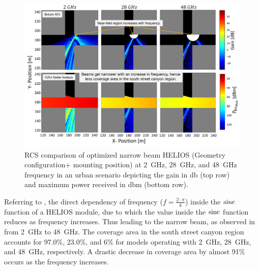 \begin{figure}[tb]
	\centering
	\includegraphics[width=0.95\linewidth]{images/Section 4 Images/Freq_vary_2}
	\caption{RCS comparison of optimized narrow beam HELIOS (Geometry configuration+ mounting position) at \SI{2}{\giga\hertz}, \SI{28}{\giga\hertz}, and \SI{48}{\giga\hertz} frequency in an urban scenario depicting the gain in \si{\decibel} (top row) and maximum power received in \si{\decibel}m (bottom row).}
	\label{fig:Freq_vary_2}
\end{figure} 

Referring to , the direct dependency of frequency ($f=\frac{2\cdot \pi}{k}$) inside the $\operatorname{sinc}$ function of a HELIOS module, due to which the value inside the $\operatorname{sinc}$ function reduces as frequency increases. Thus leading to the narrow beam, as observed in  from \SI{2}{\giga\hertz} to \SI{48}{\giga\hertz}. The coverage area in the south street canyon region accounts for \num{97.0}\%, \num{23.0}\%, and \num{6}\% for models operating with \SI{2}{\giga\hertz}, \SI{28}{\giga\hertz}, and \SI{48}{\giga\hertz}, respectively. A drastic decrease in coverage area by almost \num{91}\% occurs as the frequency increases. 
